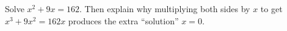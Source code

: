 Solve $x^2+9x=162$. Then explain why multiplying both sides by $x$ to get $x^3+9x^2=162x$ produces the extra ``solution'' $x=0$.

